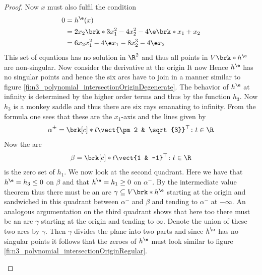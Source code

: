 \begin{proof}
  Now $x$ must also fulfil the condition
  \begin{align}
    0&=h^\e(x) \\
    &=2x_2\brk*{3x_1^2-4x_2^2}-4\e\brk*{x_1+x_2} \\
    &=6x_2x_1^2-4\e x_1-8x_2^3-4\e x_2
  \end{align}
  This set of equations has no solution in $\R^2$ and thus all points in $V\brk*{h^\e}$
  are non-singular.
  Now consider the derivative at the origin
  It now 
  Hence $h^\e$ has no singular points and hence the six arcs have to join in
  a manner similar to figure \ref{fi:n3_polynomial_intersectionOriginDegenerate}.
  The behavior of $h^\e$ at infinity is determined by the higher order terms and thus
  by the function $h_3$. Now $h_3$ is a monkey saddle and thus there are six rays emanating
  to infinity. From the formula one sees that these are the $x_1$-axis and the lines given by 
  \begin{align}
    \alpha^\pm=\brk[c]*{t\vect{\pm 2 & \sqrt{3}}^\top\colon t\in\R}
  \end{align}
  Now the arc
  \begin{align}
    \beta=\brk[c]*{t\vect{1 & -1}^\top\colon t\in\R}
  \end{align}
  is the zero set of $h_1$. We now look at the second quadrant. Here we have that
  $h^\e=h_3\leq0$ on $\beta$ and that
  $h^\e=h_1\geq0$ on $\alpha^-$. By the intermediate value theorem thus there must be an arc
  $\gamma\subseteq V\brk*{h^\e}$ starting at the origin 
  and sandwiched in this quadrant
  between $\alpha^-$ and $\beta$
  and tending to $\alpha^-$ at $-\infty$.
  An analogous argumentation on the third quadrant shows that here too there must be an arc
  $\gamma$ starting at the origin and tending to $\infty$. 
  Denote the union of these two arcs by $\gamma$. Then $\gamma$ divides the plane into two
  parts and since $h^\e$ has no singular points it follows that the zeroes of $h^\e$
  must look similar to figure \ref{fi:n3_polynomial_intersectionOriginRegular}.
  \begin{figure}
    \centering
    \begin{subfigure}[b]{0.3\textwidth}
    \centering
    

\end{subfigure}
\end{figure}
\end{proof}
